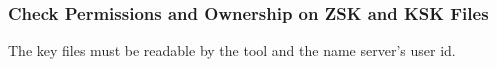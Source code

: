 
\subsubsection{Check Permissions and Ownership on ZSK and KSK Files}

The key files must be readable by the  tool and the
name server's user id.

